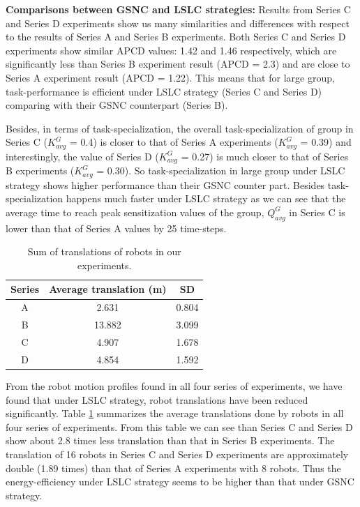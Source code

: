 \documentclass[final,5p,times,twocolumn]{elsarticle}
\begin{document}
\textbf{Comparisons between GSNC and LSLC strategies:} Results from Series C and Series D experiments show us many similarities and differences with respect to the results of Series A and Series B experiments. Both Series C and Series D experiments show similar APCD values: 1.42 and 1.46 respectively, which are significantly less than Series B experiment result (APCD = 2.3) and are close to Series A experiment result (APCD = 1.22). This means that for large group, task-performance  is efficient under LSLC strategy (Series C and Series D) comparing with their GSNC counterpart (Series B).

Besides, in terms of task-specialization, the overall task-specialization of group in Series C ($K^G_{avg}$ = 0.4) is  closer to that of Series A experiments ($K^G_{avg}$ = 0.39) and interestingly, the value of  Series D ($K^G_{avg}$ = 0.27) is  much closer to that of Series B experiments ($K^G_{avg}$ = 0.30). So task-specialization in large group under LSLC strategy shows higher performance than their GSNC counter part. Besides task-specialization happens much faster under LSLC strategy as we can see that the average time to reach peak sensitization values  of the group,  $Q^G_{avg}$ in Series C is lower than that of Series A values by 25 time-steps.

\begin{table}
\begin{center}
\caption{Sum of translations of robots in our experiments.}
\begin{tabular}{|c|c|c|}
\hline \textbf{Series} & \textbf{Average translation (m)} & \textbf{SD} \\ 
\hline A & 2.631 & 0.804\\ 
\hline B & 13.882 & 3.099\\
\hline C & 4.907 & 1.678\\
\hline D & 4.854 & 1.592\\
\hline
\end{tabular}
\label{table:motion-cmp} 
\end{center}
\end{table}
From the robot motion profiles found in all four series of experiments, we have found that under LSLC strategy, robot translations have been reduced significantly. Table \ref{table:motion-cmp} summarizes the average translations done by robots in all four series of experiments. From this table we can see than Series C and Series D show about 2.8 times less translation than that in Series B experiments. The translation of 16 robots in Series C and Series D experiments are approximately double (1.89 times) than that of Series A experiments with 8 robots.  Thus the energy-efficiency under LSLC strategy seems to be higher  than that under GSNC strategy.
\end{document}
